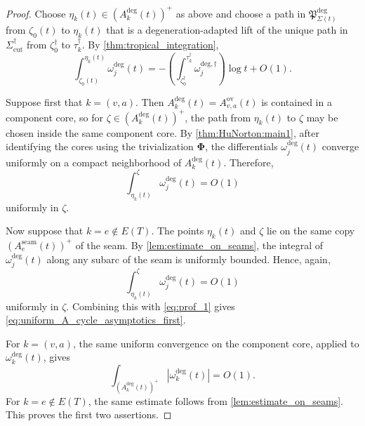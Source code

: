 \documentclass[12pt]{amsart}
\numberwithin{equation}{section}
\theoremstyle{definition}
\def\edges{E}
\def\trop{\dagger}
\def\ptSig{\zeta}
\def\basept{{\ptSig_0}}
\def\baseptT{{\ptSig_0^\trop}}
\def\mcurve{\Sigma}
\def\tropmcurve{\mcurve^\trop}
\begin{document}
\begin{proof}
Choose $\eta_k(t)\in(A_k^{\mathrm{deg}}(t))^+$ as above and choose a
path in $\mathfrak P_{\mcurve(t)}^{\mathrm{deg}}$ from $\basept(t)$ to
$\eta_k(t)$ that is a degeneration-adapted lift of the unique path in
$\tropmcurve_{\mathrm{cut}}$ from $\baseptT$ to
$\tau_k^\trop$. By
\cref{thm:tropical_integration},
\begin{equation}
\label{eq:prof_1}
\int_{\basept(t)}^{\eta_k(t)}
\omega_j^{\mathrm{deg}}(t)
=
-
\left(
\int_{\baseptT}^{\tau_k^\trop}
\omega_j^{\mathrm{deg},\trop}
\right)
\log t
+
O(1).
\end{equation}

Suppose first that $k=(v,a)$. Then
$A_k^{\mathrm{deg}}(t)=A_{v,a}^{\mathrm{ov}}(t)$ is contained in a
component core, so for
$\zeta\in(A_k^{\mathrm{deg}}(t))^+$, the path from $\eta_k(t)$ to
$\zeta$ may be chosen inside the same component core. By
\cref{thm:HuNorton:main1}, after identifying the cores using the
trivialization $\bm\Phi$, the differentials
$\omega_j^{\mathrm{deg}}(t)$ converge uniformly on a compact
neighborhood of $A_k^{\mathrm{deg}}(t)$. Therefore,
\begin{equation}
\label{eq:prof_2}
\int_{\eta_k(t)}^\zeta
\omega_j^{\mathrm{deg}}(t)
=
O(1)
\end{equation}
uniformly in $\zeta$.

Now suppose that $k=e\notin\edges(T)$. The points
$\eta_k(t)$ and $\zeta$ lie on the same copy
$(A_e^{\mathrm{seam}}(t))^+$ of the seam. By
\cref{lem:estimate_on_seams}, the integral of
$\omega_j^{\mathrm{deg}}(t)$ along any subarc of the seam is uniformly
bounded. Hence, again,
\begin{equation}
\int_{\eta_k(t)}^\zeta
\omega_j^{\mathrm{deg}}(t)
=
O(1)
\end{equation}
uniformly in $\zeta$. Combining this with \eqref{eq:prof_1} gives
\eqref{eq:uniform_A_cycle_asymptotics_first}.

For $k=(v,a)$, the same uniform convergence on the component core,
applied to $\omega_k^{\mathrm{deg}}(t)$, gives
\[
\int_{(A_k^{\mathrm{deg}}(t))^+}
\left|
\omega_k^{\mathrm{deg}}(t)
\right|
=
O(1).
\]
For $k=e\notin\edges(T)$, the same estimate follows from
\cref{lem:estimate_on_seams}. This proves the first two assertions.


\end{proof}
\end{document}
